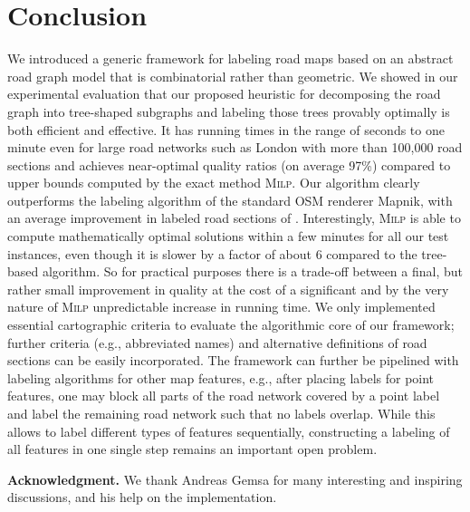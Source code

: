\documentclass[a4paper,11pt]{article}
\newcommand{\ILPAlgo}{\textsc{Milp}\xspace}
\begin{document}
\section{Conclusion}
We introduced a generic framework for labeling road maps based on an
abstract road graph model that is combinatorial rather than geometric.
We showed in our experimental evaluation that our proposed heuristic
for decomposing the road graph into tree-shaped subgraphs and labeling
those trees provably optimally is both efficient and effective.  It
has running times in the range of seconds to one minute even for large
road networks such as London with more than 100,000 road sections and
achieves near-optimal quality ratios (on average 97\%) compared to
upper bounds computed by the exact method \ILPAlgo.  Our algorithm
clearly outperforms the labeling algorithm of the standard OSM
renderer Mapnik, with an average improvement in labeled road sections
of .  Interestingly, \ILPAlgo is able to compute mathematically
optimal solutions within a few minutes for all our test instances,
even though it is slower by a factor of about 6 compared to the
tree-based algorithm. So for practical purposes there is a trade-off
between a final, but rather small improvement in quality at the cost
of a significant and by the very nature of \ILPAlgo unpredictable
increase in running time. We only implemented essential cartographic
criteria to evaluate the algorithmic core of our framework; further
criteria (e.g., abbreviated names) and alternative definitions of road sections can be easily incorporated.
The framework can further be pipelined with labeling
  algorithms for other map features, e.g., after placing labels for point features,
  one may block all parts of the road network covered by a point label and label the remaining road
  network such that no labels overlap. While this allows to label
  different types of features sequentially, constructing a labeling of
  all features in one single step remains an important open problem.



\medskip
\noindent\textbf{Acknowledgment.} We thank Andreas Gemsa for many interesting
and inspiring discussions, and his help on the implementation.
\end{document}
